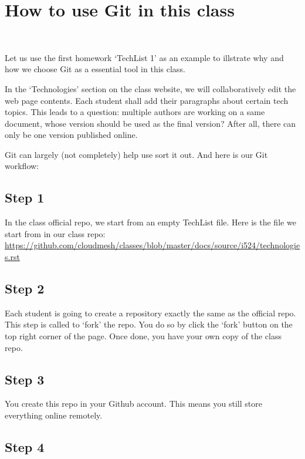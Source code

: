 \section{How to use Git in this class}\label{how-to-use-git-in-this-class}

\FILENAME\

Let us use the first homework `TechList 1' as an example to illstrate
why and how we choose Git as a essential tool in this class.

In the `Technologies' section on the class website, we will
collaboratively edit the web page contents. Each student shall add their
paragraphs about certain tech topics. This leads to a question: multiple
authors are working on a same document, whose version should be used as
the final version? After all, there can only be one version published
online.

Git can largely (not completely) help use sort it out. And here is our
Git workflow:

\subsection{Step 1}\label{step-1}

In the class official repo, we start from an empty TechList file. Here
is the file we start from in our class repo:
\url{https://github.com/cloudmesh/classes/blob/master/docs/source/i524/technologies.rst}

\subsection{Step 2}\label{step-2}

Each student is going to create a repository exactly the same as the
official repo. This step is called to `fork' the repo. You do so by
click the `fork' button on the top right corner of the page. Once done,
you have your own copy of the class repo.

\subsection{Step 3}\label{step-3}

You create this repo in your Github account. This means you still store
everything online remotely.

\subsection{Step 4}\label{step-4}


